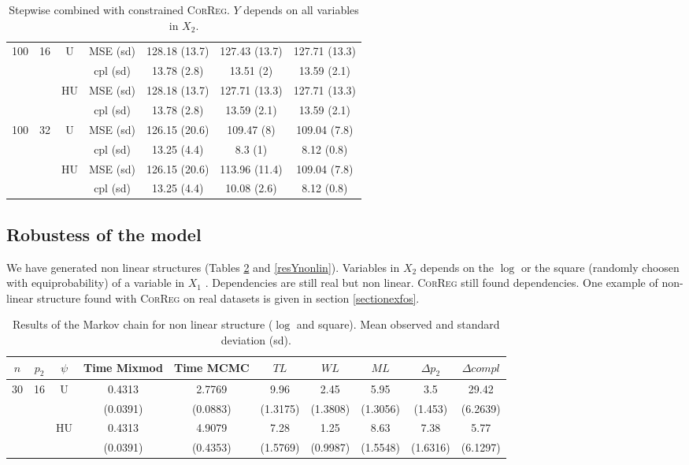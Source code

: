 \documentclass[11pt,a4paper]{article}
\begin{document}
\begin{table}[h!]
\begin{tabular}{|c|c|c|c|c|c|c|}
\hline
\hline %
100 & 16 & U&  MSE (sd) & 128.18 (13.7) & 127.43 (13.7) & 127.71 (13.3) \\
& & &  cpl (sd) & 13.78 (2.8) & 13.51 (2) & 13.59 (2.1) \\
 &  &HU & MSE (sd) & 128.18 (13.7) & 127.71 (13.3) & 127.71 (13.3) \\
& & & cpl (sd) & 13.78 (2.8) & 13.59 (2.1) & 13.59 (2.1) \\
\hline %
100 & 32 & U& MSE (sd) & 126.15 (20.6) & 109.47 (8) & 109.04 (7.8) \\
& & & cpl (sd) & 13.25 (4.4) & 8.3 (1) & 8.12 (0.8) \\
 &  &HU &  MSE (sd) & 126.15 (20.6) & 113.96 (11.4) & 109.04 (7.8) \\
& & & cpl (sd) & 13.25 (4.4) & 10.08 (2.6) & 8.12 (0.8) \\
\hline
\end{tabular} 
\caption{Stepwise  combined with constrained \textsc{CorReg}. $Y$ depends on all variables in $X_2$.}\label{YX2linstep}
\end{table}

\clearpage
\subsection{Robustess of the model}
 We have generated non linear structures (Tables \ref{compZnonlin} and \ref{resYnonlin}). Variables in $X_2$ depends on the $\log$ or the square (randomly choosen with equiprobability) of a variable in $X_1$ . Dependencies are still real but non linear. \textsc{CorReg} still found dependencies. One example of non-linear structure found with \textsc{CorReg} on real datasets is given in section \ref{sectionexfos}.
\begin{table}[h!]
\centering
\begin{tabular}{|c|c|c|c|c|c|c|c|c|c|}
\hline
$n$ & $p_2$ & $\psi$ &Time Mixmod  & Time MCMC  & $TL$ & $WL$ & $ML$ & $\Delta p_2$ & $\Delta compl$ \\
\hline
30 & 16 & U& 0.4313 & 2.7769 & 9.96 & 2.45 & 5.95 & 3.5 & 29.42  \\
& & &(0.0391) & (0.0883) & (1.3175) & (1.3808) & (1.3056) & (1.453) & (6.2639) \\
 &  & HU & 0.4313 & 4.9079 & 7.28 & 1.25 & 8.63 & 7.38 & 5.77  \\ 
& & &(0.0391) & (0.4353) & (1.5769) & (0.9987) & (1.5548) & (1.6316) & (6.1297) \\ 
\hline
\end{tabular} 
\caption{Results of the Markov chain for non linear structure ($\log$ and square). Mean observed and standard deviation (sd). } \label{compZnonlin}
\end{table}
\end{document}
